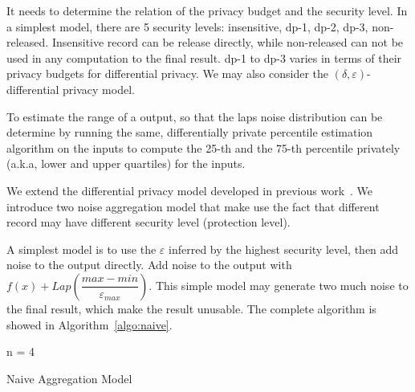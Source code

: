 It needs to determine the relation of the privacy budget and the security
level.
In a simplest model, there are 5 security levels: insensitive, dp-1,
dp-2, dp-3, non-released. Insensitive record can be release directly,
while non-released can not be used in
any computation to the final result. dp-1 to dp-3 varies in terms of their
privacy budgets for differential privacy.
We may also consider the $(\delta, \varepsilon)$-differential privacy model.

% 
To estimate the range of a output, so that the laps noise distribution
can be determine by running the same, differentially private percentile 
estimation algorithm on the inputs to compute the 25-th and the 75-th 
percentile privately (a.k.a, lower and upper quartiles) for the inputs.

We extend the differential privacy model developed in previous
work~\cite{differentialdp:stoc11}. We introduce two noise aggregation model
that make use the fact that different record may have
different security level (protection level).

A simplest model is to use the $\varepsilon$ inferred by the highest security
level, then add noise to the output directly.
Add noise to the output with $f(x) + Lap(\dfrac{max - min}{\varepsilon_{max}})$.
This simple model may generate two much noise to the final result, which
make the result unusable. The complete algorithm is showed in 
Algorithm~\ref{algo:naive}.

\begin{algorithm}[t]
\SetAlgoLined
{}
  n = 4

 \caption{Naive Aggregation Model}
 \label{algo:naive}
\end{algorithm}

